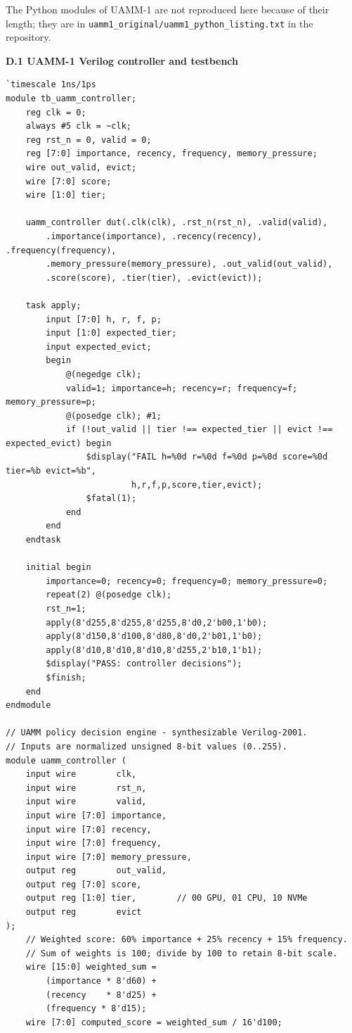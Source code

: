 \documentclass[12pt,a4paper]{report}
\begin{document}
The Python modules of UAMM-1 are not reproduced here because of their length; they are in \texttt{uamm1\_\allowbreak{}\allowbreak{}original/\allowbreak{}uamm1\_\allowbreak{}\allowbreak{}python\_\allowbreak{}\allowbreak{}listing.\allowbreak{}txt} in the repository.

\par\smallskip\noindent\textbf{D.1  UAMM-1 Verilog controller and testbench}\par\nopagebreak
\begin{lstlisting}
`timescale 1ns/1ps
module tb_uamm_controller;
    reg clk = 0;
    always #5 clk = ~clk;
    reg rst_n = 0, valid = 0;
    reg [7:0] importance, recency, frequency, memory_pressure;
    wire out_valid, evict;
    wire [7:0] score;
    wire [1:0] tier;

    uamm_controller dut(.clk(clk), .rst_n(rst_n), .valid(valid),
        .importance(importance), .recency(recency), .frequency(frequency),
        .memory_pressure(memory_pressure), .out_valid(out_valid),
        .score(score), .tier(tier), .evict(evict));

    task apply;
        input [7:0] h, r, f, p;
        input [1:0] expected_tier;
        input expected_evict;
        begin
            @(negedge clk);
            valid=1; importance=h; recency=r; frequency=f; memory_pressure=p;
            @(posedge clk); #1;
            if (!out_valid || tier !== expected_tier || evict !== expected_evict) begin
                $display("FAIL h=%0d r=%0d f=%0d p=%0d score=%0d tier=%b evict=%b",
                         h,r,f,p,score,tier,evict);
                $fatal(1);
            end
        end
    endtask

    initial begin
        importance=0; recency=0; frequency=0; memory_pressure=0;
        repeat(2) @(posedge clk);
        rst_n=1;
        apply(8'd255,8'd255,8'd255,8'd0,2'b00,1'b0);
        apply(8'd150,8'd100,8'd80,8'd0,2'b01,1'b0);
        apply(8'd10,8'd10,8'd10,8'd255,2'b10,1'b1);
        $display("PASS: controller decisions");
        $finish;
    end
endmodule

// UAMM policy decision engine - synthesizable Verilog-2001.
// Inputs are normalized unsigned 8-bit values (0..255).
module uamm_controller (
    input wire        clk,
    input wire        rst_n,
    input wire        valid,
    input wire [7:0] importance,
    input wire [7:0] recency,
    input wire [7:0] frequency,
    input wire [7:0] memory_pressure,
    output reg        out_valid,
    output reg [7:0] score,
    output reg [1:0] tier,        // 00 GPU, 01 CPU, 10 NVMe
    output reg        evict
);
    // Weighted score: 60% importance + 25% recency + 15% frequency.
    // Sum of weights is 100; divide by 100 to retain 8-bit scale.
    wire [15:0] weighted_sum =
        (importance * 8'd60) +
        (recency    * 8'd25) +
        (frequency * 8'd15);
    wire [7:0] computed_score = weighted_sum / 16'd100;


\end{lstlisting}
\end{document}
